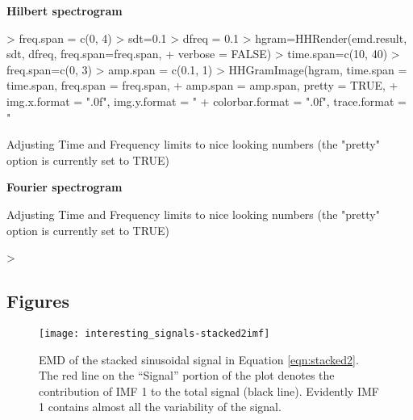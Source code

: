 \documentclass[12pt]{article}
\begin{document}
\textbf{Hilbert spectrogram}
\begin{Schunk}
\begin{Sinput}
> freq.span = c(0, 4)
> sdt=0.1
> dfreq = 0.1
> hgram=HHRender(emd.result, sdt, dfreq, freq.span=freq.span, 
+    verbose = FALSE)
> time.span=c(10, 40)
> freq.span=c(0, 3)
> amp.span = c(0.1, 1)
> HHGramImage(hgram, time.span = time.span, freq.span = freq.span,
+     amp.span = amp.span, pretty = TRUE,
+     img.x.format = ".0f", img.y.format = "%.0f",
+     colorbar.format = ".0f", trace.format = "%.1f")
\end{Sinput}
\begin{Soutput}
Adjusting Time and Frequency limits to nice looking numbers (the "pretty" option is currently set to TRUE)
\end{Soutput}
\end{Schunk}

\textbf{Fourier spectrogram}
\begin{Schunk}
\begin{Soutput}
Adjusting Time and Frequency limits to nice looking numbers (the "pretty" option is currently set to TRUE)
\end{Soutput}
\begin{Sinput}
> 
\end{Sinput}
\end{Schunk}

\subsection{Figures}

\FloatBarrier

\begin{figure}[ht]
\begin{center}
\texttt{[image: interesting\_signals-stacked2imf]}
\end{center}
\caption{EMD of the stacked sinusoidal signal in Equation \ref{eqn:stacked2}.
The red line on the ``Signal'' portion of the plot denotes the contribution of IMF 1 to the total signal (black line).
Evidently IMF 1 contains almost all the variability of the signal.}
\label{fig:stacked2imf}
\end{figure}
\end{document}
